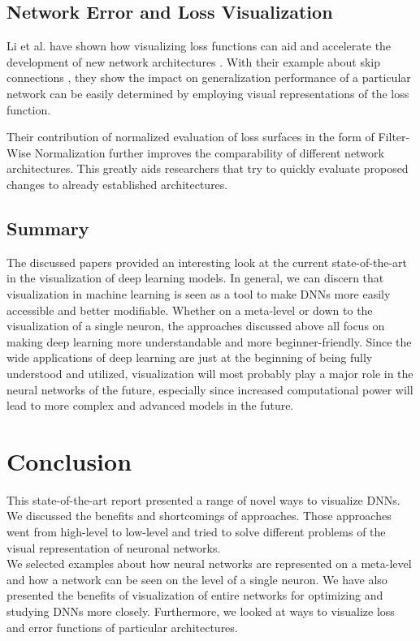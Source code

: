 \documentclass{acmsiggraph}               %
\begin{document}
\subsection{Network Error and Loss Visualization}

Li et al. have shown how visualizing loss functions can aid and accelerate the development of new network architectures \cite{Li2017}.
With their example about skip connections \cite{He2015}, they show the impact on generalization performance of a particular network can be easily determined by employing visual representations of the loss function.

Their contribution of normalized evaluation of loss surfaces in the form of Filter-Wise Normalization further improves the comparability of different network architectures. This greatly aids researchers that try to quickly evaluate proposed changes to already established architectures.

\subsection{Summary}
The discussed papers provided an interesting look at the current state-of-the-art in the visualization of deep learning models. In general, we can discern that visualization in machine learning is seen as a tool to make DNNs more easily accessible and better modifiable. Whether on a meta-level or down to the visualization of a single neuron, the approaches discussed above all focus on making deep learning more understandable and more beginner-friendly. Since the wide applications of deep learning are just at the beginning of being fully understood and utilized, visualization will most probably play a major role in the neural networks of the future, especially since increased computational power will lead to more complex and advanced models in the future.

\section{Conclusion}
This state-of-the-art report presented a range of novel ways to visualize DNNs. We discussed the benefits and shortcomings of approaches. Those approaches went from high-level to low-level and tried to solve different problems of the visual representation of neuronal networks.\\
We selected examples about how neural networks are represented on a meta-level and how a network can be seen on the level of a single neuron. We have also presented the benefits of visualization of entire networks for optimizing and studying DNNs more closely. Furthermore, we looked at ways to visualize loss and error functions of particular architectures.\\
\end{document}
